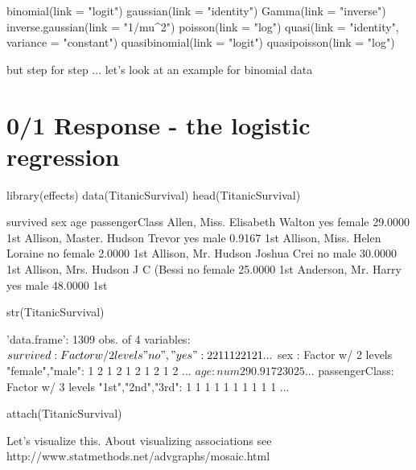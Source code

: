 \documentclass[a4paper,twoside]{tufte-book}\usepackage[]{graphicx}\usepackage[]{color}
\begin{document}
\begin{appendices}
\begin{Schunk}
\begin{Sinput}
binomial(link = "logit")
gaussian(link = "identity")
Gamma(link = "inverse")
inverse.gaussian(link = "1/mu^2")
poisson(link = "log")
quasi(link = "identity", variance = "constant")
quasibinomial(link = "logit")
quasipoisson(link = "log")
\end{Sinput}
\end{Schunk}

but step for step ... let's look at an example for binomial data


\section{0/1 Response - the logistic regression}

\begin{Schunk}
\begin{Sinput}
library(effects) 
data(TitanicSurvival)
head(TitanicSurvival)
\end{Sinput}
\begin{Soutput}
                                survived    sex     age passengerClass
Allen, Miss. Elisabeth Walton        yes female 29.0000            1st
Allison, Master. Hudson Trevor       yes   male  0.9167            1st
Allison, Miss. Helen Loraine          no female  2.0000            1st
Allison, Mr. Hudson Joshua Crei       no   male 30.0000            1st
Allison, Mrs. Hudson J C (Bessi       no female 25.0000            1st
Anderson, Mr. Harry                  yes   male 48.0000            1st
\end{Soutput}
\begin{Sinput}
str(TitanicSurvival)
\end{Sinput}
\begin{Soutput}
'data.frame':	1309 obs. of  4 variables:
 $ survived      : Factor w/ 2 levels "no","yes": 2 2 1 1 1 2 2 1 2 1 ...
 $ sex           : Factor w/ 2 levels "female","male": 1 2 1 2 1 2 1 2 1 2 ...
 $ age           : num  29 0.917 2 30 25 ...
 $ passengerClass: Factor w/ 3 levels "1st","2nd","3rd": 1 1 1 1 1 1 1 1 1 1 ...
\end{Soutput}
\begin{Sinput}
attach(TitanicSurvival)
\end{Sinput}
\end{Schunk}

Let's visualize this. About visualizing associations see http://www.statmethods.net/advgraphs/mosaic.html


\end{appendices}
\end{document}
